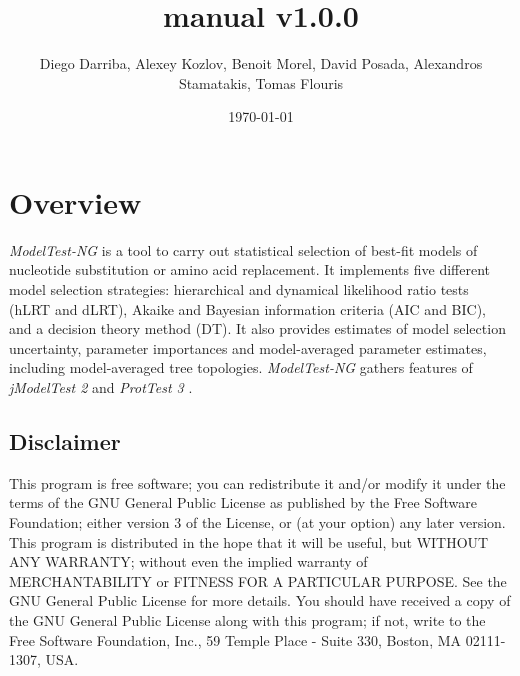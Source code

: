 \documentclass[10pt,twoside,a4paper]{article}
\begin{document}
\providecommand{\versionnumber}{1.0.0}
\title{\normalsize manual v\versionnumber}
\author{Diego Darriba, Alexey Kozlov, Benoit Morel, David Posada, Alexandros Stamatakis, Tomas Flouris}
\date{\today}
\maketitle

\newcommand{\modeltest}{\emph{ModelTest-NG} }
\newcommand{\modeltestbin}{\emph{modeltest-ng} }
\newcommand{\modeltestguibin}{\emph{modeltest-gui} }

\setcounter{tocdepth}{2}
\tableofcontents

\clearpage
\setlength{\parskip}{1em}

\section{Overview}

{\modeltest} is a tool to carry out statistical selection of best-fit models of nucleotide substitution or amino acid replacement.
It implements five different model selection strategies: hierarchical and dynamical likelihood ratio tests (hLRT and dLRT), Akaike and Bayesian information criteria (AIC and BIC), and a decision theory method (DT).
It also provides estimates of model selection uncertainty, parameter importances and model-averaged parameter estimates, including model-averaged tree topologies.
{\modeltest} gathers features of {\em jModelTest 2} \citep{darriba2012} and {\em ProtTest 3} \citep{darriba2011}.

\subsection{Disclaimer}

{\footnotesize
This program is free software; you can redistribute it and/or modify it under the terms of the GNU General Public License as published by the Free Software Foundation;
either version 3 of the License, or (at your option) any later version. This program is distributed in the hope that it will be useful, but WITHOUT ANY WARRANTY;
without even the implied warranty of MERCHANTABILITY or FITNESS FOR A PARTICULAR PURPOSE. See the GNU General Public License for more details.
You should have received a copy of the GNU General Public License along with this program; if not, write to the Free Software Foundation, Inc., 59 Temple Place - Suite 330, Boston, MA 02111-1307, USA.
}
\end{document}
